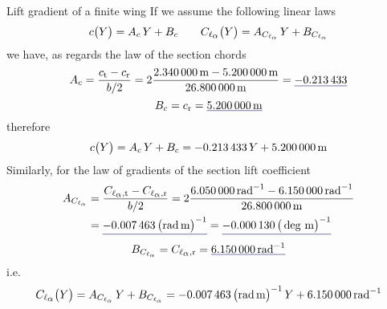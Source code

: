 \documentclass[[12pt,twoside]{book}
\begin{document}
\begin{myExampleX}{Lift gradient of a finite wing}{}
\medskip
If we assume the following linear laws
\[
c \big( Y \big) = A_c \, Y + B_c 
\qquad
C_{\ell_\mathlarger{\alpha}} \big( Y \big) = A_{C_{\ell_\alpha}} \, Y + B_{C_{\ell_\alpha}}
\]
we have, as regards the law of the section chords
\[
A_c
  = \frac{c_\mathrm{t} - c_\mathrm{r}}{b/2}
  = 
    2 \frac{
      \SI[round-precision=2]{\myChordTipWingMT}{\metre} - \SI[round-precision=2]{\myChordRootWingMT}{\metre}
    }{
      \SI[round-precision=2]{\mySpanWingMT}{\metre}
    }
  = \mathunderline{mydarkblue}{ \SI[round-precision=3]{\myCoeffAChordWing}{} }
\]
\[
B_c
  = c_\mathrm{r}
  = \mathunderline{mydarkblue}{ \SI[round-precision=2]{\myCoeffBChordWingMT}{\metre} }
\]
therefore
\[
c \big( Y \big) = A_c \, Y + B_c
  = \SI[round-precision=3]{\myCoeffAChordWing}{} \, Y
    + \SI[round-precision=2]{\myCoeffBChordWingMT}{\metre}
\]
Similarly, for the law of gradients of the section lift coefficient
\[
\begin{split}
A_{C_{\ell_\alpha}}
  & {}= \frac{C_{\ell_\mathlarger{\alpha},\mathrm{t}} - C_{\ell_\mathlarger{\alpha},\mathrm{r}}}{b/2}
  = 
    2 \frac{
      \SI[round-precision=2]{\myCLAlphaTipWingRAD}{\radian^{-1}} 
      - \SI[round-precision=2]{\myCLAlphaRootWingRAD}{\radian^{-1}}
    }{
      \SI[round-precision=2]{\mySpanWingMT}{\metre}
    }
\\
  & {}= 
    \mathunderline{mydarkblue}{ 
      \SI[round-precision=5]{\myCoeffAClalphaWingRADMT}{\big(\radian\,\metre\big)^{-1}} 
    }
  = 
    \mathunderline{mydarkblue}{ 
      \SI[round-precision=7]{\myCoeffAClalphaWingDEGMT}{\big(\deg\,\metre\big)^{-1}} 
    }
\end{split}
\]
\[
B_{C_{\ell_\alpha}}
  = C_{\ell_\mathlarger{\alpha},\mathrm{r}}
  = \mathunderline{mydarkblue}{ \SI[round-precision=3]{\myCoeffBClalphaWingRAD}{\radian^{-1}} }
\]
i.e.
\[
C_{\ell_\mathlarger{\alpha}} \big( Y \big) = A_{C_{\ell_\alpha}} \, Y + B_{C_{\ell_\alpha}}
  = \SI[round-precision=5]{\myCoeffAClalphaWingRADMT}{\big(\radian\,\metre\big)^{-1}} \, Y
    + \SI[round-precision=3]{\myCoeffBClalphaWingRAD}{\radian^{-1}}
\]


\end{myExampleX}
\end{document}
